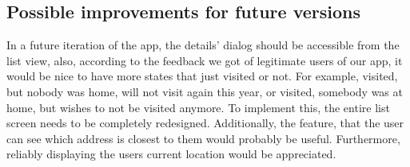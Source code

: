 \subsection{Possible improvements for future versions}

In a future iteration of the app, the details' dialog should be accessible from the list view, also, according to the feedback we got of legitimate users of our app, it would be nice to have more states that just visited or not. For example, visited, but nobody was home, will not visit again this year, or visited, somebody was at home, but wishes to not be visited anymore. To implement this, the entire list screen needs to be completely redesigned. Additionally, the feature, that the user can see which address is closest to them would probably be useful. Furthermore, reliably displaying the users current location would be appreciated.


\newpage